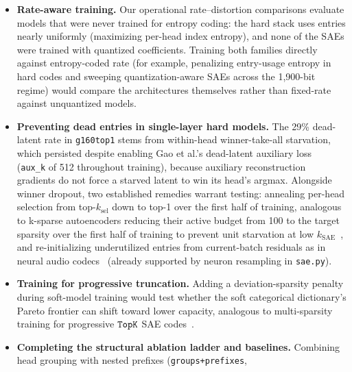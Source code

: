 \begin{itemize}
explicit per-head logit normalization (\texttt{logit\_norm}), classifier
logit norms rescale during training to offset temperature annealing after
an initial transient (Appendix~\ref{sec:gpt2ablation}). Future
straight-through runs should normalize logits per head, regulate
temperature $t$ via a logit-spread$/t$ setpoint controller rather than a
hand-tuned schedule, or add a logit-scale regularizer analogous to the
commitment loss that anchors encoder outputs to codebook vectors in
VQ-VAE~\cite{vandenoord2017}.
\item \textbf{Rate-aware training.} Our operational rate--distortion
comparisons evaluate models that were never trained for entropy coding:
the hard stack uses entries nearly uniformly (maximizing per-head index
entropy), and none of the SAEs were trained with quantized coefficients.
Training both families directly against entropy-coded rate (for example,
penalizing entry-usage entropy in hard codes and sweeping
quantization-aware SAEs across the 1{,}900-bit regime) would compare the
architectures themselves rather than fixed-rate against unquantized
models.
\item \textbf{Preventing dead entries in single-layer hard models.} The
29\% dead-latent rate in \texttt{g160top1} stems from within-head
winner-take-all starvation, which persisted despite enabling Gao et al.'s
dead-latent auxiliary loss~\cite{gao2024} (\texttt{aux\_k} of 512
throughout training), because auxiliary reconstruction gradients do not
force a starved latent to win its head's argmax. Alongside winner
dropout, two established remedies warrant testing: annealing per-head
selection from top-$k_{\mathrm{sel}}$ down to top-1 over the first half
of training, analogous to k-sparse autoencoders reducing their active
budget from 100 to the target sparsity over the first half of training to
prevent unit starvation at low $k_{\mathrm{SAE}}$~\cite{makhzani2014}, and
re-initializing underutilized entries from current-batch residuals as in
neural audio codecs~\cite{zeghidour2021} (already supported by neuron
resampling in \texttt{sae.py}).
\item \textbf{Training for progressive truncation.} Adding a
deviation-sparsity penalty during soft-model training would test whether
the soft categorical dictionary's Pareto frontier can shift toward lower
capacity, analogous to multi-sparsity training for progressive $\mathop{\mathtt{TopK}}\limits$
SAE codes~\cite{gao2024}.
\item \textbf{Completing the structural ablation ladder and baselines.}
Combining head grouping with nested prefixes (\texttt{groups+prefixes},

\end{itemize}
